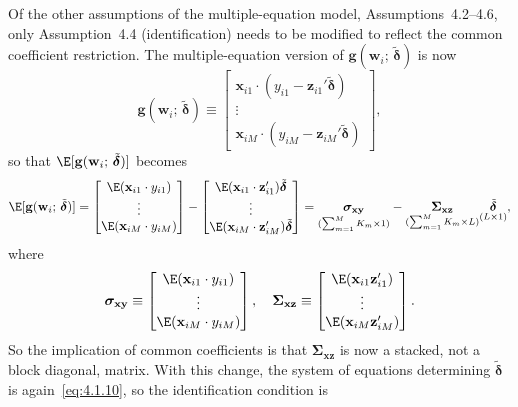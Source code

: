 Of the other assumptions of the multiple-equation model, Assumptions~4.2--4.6,
only Assumption~4.4 (identification) needs to be modified to reflect the common
coefficient restriction. The multiple-equation version of
$\mathbf{g}(\mathbf{w}_i;\, \tilde{\boldsymbol{\delta}})$ is now
\begin{equation}
\mathbf{g}(\mathbf{w}_i;\, \tilde{\boldsymbol{\delta}})
\equiv \begin{bmatrix}
\mathbf{x}_{i1} \cdot (y_{i1} - \mathbf{z}_{i1}' \tilde{\boldsymbol{\delta}}) \\
\vdots \\
\mathbf{x}_{iM} \cdot (y_{iM} - \mathbf{z}_{iM}' \tilde{\boldsymbol{\delta}})
\end{bmatrix},
\label{eq:4.6.2}
\end{equation}
so that $\E[\mathbf{g}(\mathbf{w}_i;\, \tilde{\boldsymbol{\delta}})]$ becomes
\begin{equation}
\E[\mathbf{g}(\mathbf{w}_i;\, \tilde{\boldsymbol{\delta}})]
= \begin{bmatrix}
\E(\mathbf{x}_{i1} \cdot y_{i1}) \\ \vdots \\ \E(\mathbf{x}_{iM} \cdot y_{iM})
\end{bmatrix}
- \begin{bmatrix}
\E(\mathbf{x}_{i1} \cdot \mathbf{z}_{i1}') \tilde{\boldsymbol{\delta}} \\
\vdots \\
\E(\mathbf{x}_{iM} \cdot \mathbf{z}_{iM}') \tilde{\boldsymbol{\delta}}
\end{bmatrix}
= \underset{(\sum_{m=1}^{M} K_m \times 1)}{\boldsymbol{\sigma}_{\mathbf{xy}}}
- \underset{(\sum_{m=1}^{M} K_m \times L)}{\boldsymbol{\Sigma}_{\mathbf{xz}}}
\underset{(L \times 1)}{\tilde{\boldsymbol{\delta}}},
\label{eq:4.6.3}
\end{equation}
where
\begin{equation}
\boldsymbol{\sigma}_{\mathbf{xy}}
\equiv \begin{bmatrix}
\E(\mathbf{x}_{i1} \cdot y_{i1}) \\ \vdots \\ \E(\mathbf{x}_{iM} \cdot y_{iM})
\end{bmatrix}, \quad
\boldsymbol{\Sigma}_{\mathbf{xz}}
\equiv \begin{bmatrix}
\E(\mathbf{x}_{i1} \mathbf{z}_{i1}') \\ \vdots \\ \E(\mathbf{x}_{iM} \mathbf{z}_{iM}')
\end{bmatrix}.
\label{eq:4.6.4}
\end{equation}
So the implication of common coefficients is that $\boldsymbol{\Sigma}_{\mathbf{xz}}$
is now a stacked, not a block diagonal, matrix. With this change, the system of
equations determining $\tilde{\boldsymbol{\delta}}$ is again~\eqref{eq:4.1.10}, so the
identification condition is

